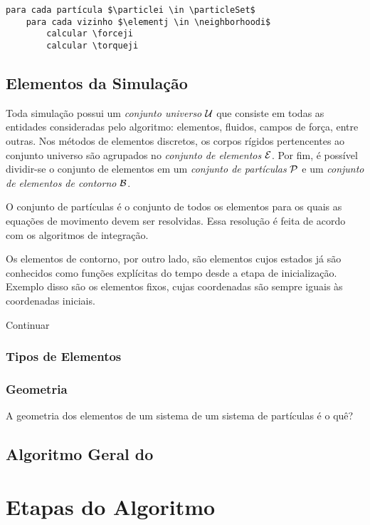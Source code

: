\begin{lstlisting}[style=pseudocode]
para cada partícula $\particlei \in \particleSet$
	para cada vizinho $\elementj \in \neighborhoodi$
		calcular \forceji
		calcular \torqueji
\end{lstlisting}

\subsection{Elementos da Simulação}

Toda simulação possui um \textit{conjunto universo} \(\mathcal{U}\) que consiste em todas as entidades consideradas pelo algoritmo: elementos, fluidos, campos de força, entre outras. Nos métodos de elementos discretos, os corpos rígidos pertencentes ao conjunto universo são agrupados no \textit{conjunto de elementos} \(\mathcal{E}\). Por fim, é possível dividir-se o conjunto de elementos em um \textit{conjunto de partículas} \(\mathcal{P}\) e um \textit{conjunto de elementos de contorno} \(\mathcal{B}\).

O conjunto de partículas é o conjunto de todos os elementos para os quais as equações de movimento devem ser resolvidas. Essa resolução é feita de acordo com os algoritmos de integração. 

Os elementos de contorno, por outro lado, são elementos cujos estados já são conhecidos como funções explícitas do tempo desde a etapa de inicialização. Exemplo disso são os elementos fixos, cujas coordenadas são sempre iguais às coordenadas iniciais.

\alert{Continuar}

\subsubsection{Tipos de Elementos}
\subsubsection{Geometria}

A geometria dos elementos de um sistema de um sistema de partículas é \alert{o quê?}

\subsection{Algoritmo Geral do \DEM{}} \label{sec:dem_algorithm}

\section{Etapas do Algoritmo}
